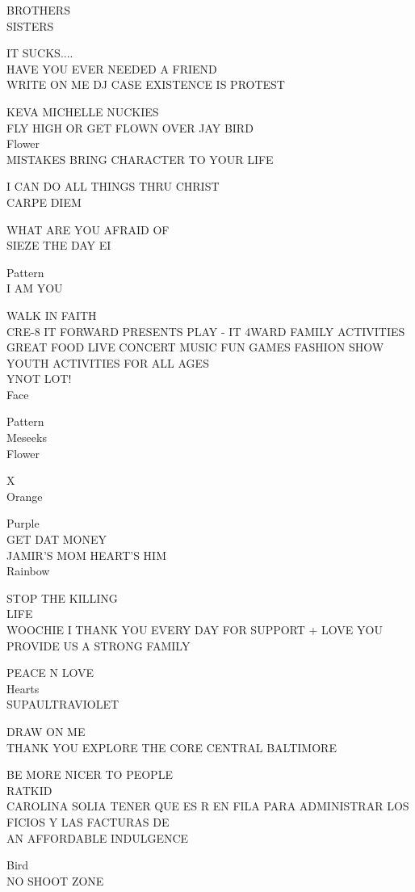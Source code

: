 \documentclass[10pt,letterpaper]{article}
\begin{document}
BROTHERS\\
SISTERS

IT SUCKS....\\
HAVE YOU EVER NEEDED A FRIEND\\
WRITE ON ME DJ CASE EXISTENCE IS PROTEST

KEVA MICHELLE NUCKIES\\
FLY HIGH OR GET FLOWN OVER JAY BIRD\\
Flower\\
MISTAKES BRING CHARACTER TO YOUR LIFE

I CAN DO ALL THINGS THRU CHRIST\\
CARPE DIEM

WHAT ARE YOU AFRAID OF\\
SIEZE THE DAY EI

Pattern\\
I AM YOU

WALK IN FAITH\\
CRE{-}8 IT FORWARD PRESENTS PLAY {-} IT 4WARD FAMILY ACTIVITIES GREAT FOOD LIVE CONCERT MUSIC FUN GAMES FASHION SHOW YOUTH ACTIVITIES FOR ALL AGES\\
YNOT LOT!\\
Face

Pattern\\
Meseeks\\
Flower

X\\
Orange

Purple\\
GET DAT MONEY\\
JAMIR'S MOM HEART'S HIM\\
Rainbow

STOP THE KILLING\\
LIFE\\
WOOCHIE I THANK YOU EVERY DAY FOR SUPPORT + LOVE YOU PROVIDE US A STRONG FAMILY

PEACE N LOVE\\
Hearts\\
SUPAULTRAVIOLET

DRAW ON ME\\
THANK YOU EXPLORE THE CORE CENTRAL BALTIMORE

BE MORE NICER TO PEOPLE\\
RATKID\\
CAROLINA SOLIA TENER QUE ES R EN FILA PARA ADMINISTRAR LOS FICIOS Y LAS FACTURAS DE\\
AN AFFORDABLE INDULGENCE

Bird\\
NO SHOOT ZONE
\end{document}
